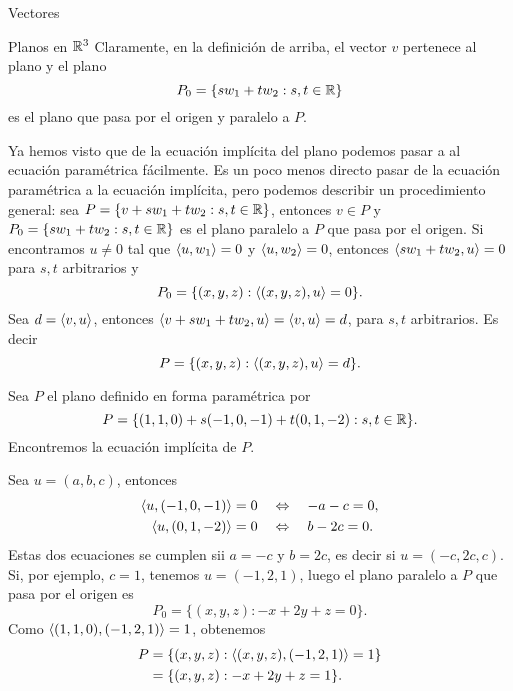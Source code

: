 \begin{chapter}{Vectores}
\begin{section}{Planos en $\mathbb R^3$}
        Claramente,  en la definición de arriba, el vector $v$ pertenece al plano y el plano 
        \begin{equation*}
        P_0 = \{sw_1 + tw_2: s,t \in \mathbb R\}
        \end{equation*}
        es el plano que pasa por el origen y paralelo a $P$. 
 
    
    Ya  hemos visto que de la ecuación implícita del plano podemos pasar a al ecuación paramétrica fácilmente. Es un poco menos directo pasar de la ecuación paramétrica a la ecuación implícita, pero podemos describir un procedimiento general: sea $P = \{v + sw_1 + tw_2: s,t \in \mathbb R\}$,  entonces $v \in P$ y $P_0 = \{sw_1 + tw_2: s,t \in \mathbb R\}$  es el plano paralelo a $P$  que pasa por el origen. Si encontramos $u \ne 0$ tal que $\langle u,w_1 \rangle =0$ y $\langle u,w_2 \rangle =0$, entonces $ \langle  sw_1 + tw_2, u \rangle =0$ para  $s,t$ arbitrarios y 
    \begin{equation*}
    P_0 = \{(x,y,z): \langle (x,y,z),u \rangle =0\}. 
    \end{equation*}
    Sea $d = \langle v, u \rangle$, entonces $\langle v + sw_1 + tw_2, u\rangle = \langle v , u\rangle =d$, para $s,t$ arbitrarios. Es decir
    \begin{equation*}
    P = \{(x,y,z): \langle (x,y,z),u \rangle =d\}. 
    \end{equation*}
      
    \begin{ejemplo*}
        Sea $P$ el plano definido en forma paramétrica por 
        \begin{equation*}
            P = \{ (1,1,0) + s(-1,0,-1) + t(0,1,-2): s,t \in \mathbb R\}.
        \end{equation*}
         Encontremos la ecuación implícita de  $P$. 
         
         Sea $u= (a,b,c)$,  entonces 
        \begin{align*}
            \langle u,(-1,0,-1) \rangle = 0 \quad &\Leftrightarrow \quad -a -c=0, \\
            \langle u,(0,1,-2) \rangle = 0 \quad &\Leftrightarrow \quad b -2c=0.
        \end{align*} 
        Estas dos ecuaciones se cumplen sii $a = -c$ y $b=2c$, es decir si $u=(-c,2c,c)$. Si, por ejemplo, $c=1$, tenemos $u=(-1,2,1)$, luego el plano paralelo a $P$  que pasa por el origen es
        \begin{equation*}
        P_0 = \{(x,y,z): -x+2y+z =0\}. 
        \end{equation*}
        Como $\langle (1,1,0),(-1,2,1) \rangle = 1 $, obtenemos
        \begin{align*}
        P &= \{(x,y,z): \langle (x,y,z),(-1,2,1) \rangle =1\} \\
        &= \{(x,y,z): -x+2y+z =1\}.
        \end{align*}
    \end{ejemplo*}


\end{section}
\end{chapter}
